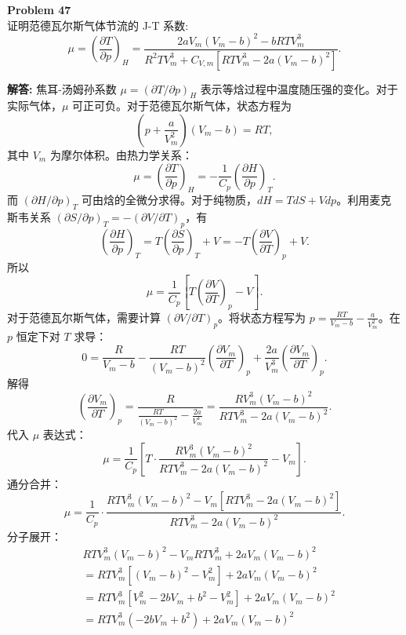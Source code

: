 \documentclass[12pt, a4paper, oneside]{ctexart}
\newenvironment{solution}{\par\noindent\textbf{解答:}\quad}{\par}
\begin{document}
\begin{mdframed}[backgroundcolor=gray!10, linewidth=0pt]
    \textbf{Problem 47} \\
    证明范德瓦尔斯气体节流的 J-T 系数:
    \[
    \mu = \left(\frac{\partial T}{\partial p}\right)_{H} = \frac{2 a V_{m} (V_{m} - b)^2 - b R T V_{m}^3}{R^2 T V_{m}^3 + C_{V, m} [R T V_{m}^3 - 2 a (V_{m} - b)^2]}.
    \]
\end{mdframed}
\begin{solution}
    焦耳-汤姆孙系数 $\mu = (\partial T / \partial p)_H$ 表示等焓过程中温度随压强的变化。对于实际气体，$\mu$ 可正可负。对于范德瓦尔斯气体，状态方程为
    \[
    \left(p + \frac{a}{V_m^2}\right)(V_m - b) = R T,
    \]
    其中 $V_m$ 为摩尔体积。由热力学关系：
    \[
    \mu = \left(\frac{\partial T}{\partial p}\right)_{H} = -\frac{1}{C_p} \left(\frac{\partial H}{\partial p}\right)_{T}.
    \]
    而 $(\partial H / \partial p)_T$ 可由焓的全微分求得。对于纯物质，$dH = T dS + V dp$。利用麦克斯韦关系 $(\partial S / \partial p)_T = -(\partial V / \partial T)_p$，有
    \[
    \left(\frac{\partial H}{\partial p}\right)_{T} = T \left(\frac{\partial S}{\partial p}\right)_{T} + V = -T \left(\frac{\partial V}{\partial T}\right)_{p} + V.
    \]
    所以
    \[
    \mu = \frac{1}{C_p} \left[ T \left(\frac{\partial V}{\partial T}\right)_{p} - V \right].
    \]
    对于范德瓦尔斯气体，需要计算 $(\partial V / \partial T)_p$。将状态方程写为 $p = \frac{R T}{V_m - b} - \frac{a}{V_m^2}$。在 $p$ 恒定下对 $T$ 求导：
    \[
    0 = \frac{R}{V_m - b} - \frac{R T}{(V_m - b)^2} \left(\frac{\partial V_m}{\partial T}\right)_p + \frac{2a}{V_m^3} \left(\frac{\partial V_m}{\partial T}\right)_p.
    \]
    解得
    \[
    \left(\frac{\partial V_m}{\partial T}\right)_p = \frac{R}{ \frac{R T}{(V_m - b)^2} - \frac{2a}{V_m^3} } = \frac{R V_m^3 (V_m - b)^2}{R T V_m^3 - 2a (V_m - b)^2}.
    \]
    代入 $\mu$ 表达式：
    \[
    \mu = \frac{1}{C_p} \left[ T \cdot \frac{R V_m^3 (V_m - b)^2}{R T V_m^3 - 2a (V_m - b)^2} - V_m \right].
    \]
    通分合并：
    \[
    \mu = \frac{1}{C_p} \cdot \frac{R T V_m^3 (V_m - b)^2 - V_m [R T V_m^3 - 2a (V_m - b)^2]}{R T V_m^3 - 2a (V_m - b)^2}.
    \]
    分子展开：
    \begin{align*}
        &R T V_m^3 (V_m - b)^2 - V_m R T V_m^3 + 2a V_m (V_m - b)^2 \\
        &= R T V_m^3 [(V_m - b)^2 - V_m^2] + 2a V_m (V_m - b)^2 \\
        &= R T V_m^3 [V_m^2 - 2b V_m + b^2 - V_m^2] + 2a V_m (V_m - b)^2 \\
        &= R T V_m^3 (-2b V_m + b^2) + 2a V_m (V_m - b)^2 \\

\end{align*}
\end{solution}
\end{document}
